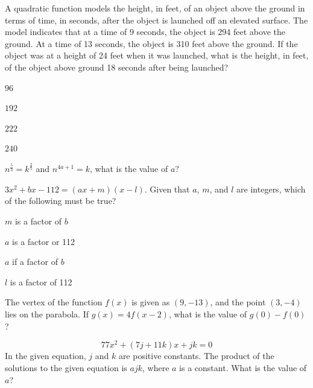 \vfill
\noindent\begin{minipage}{\linewidth}
\par\smallskip
A quadratic function models the height, in feet, of an object above the ground in terms of time, in seconds, after the object is launched off an elevated surface. The model indicates that at a time of 9 seconds, the object is 294 feet above the ground. At a time of 13 seconds, the object is 310 feet above the ground. If the object was at a height of 24 feet when it was launched, what is the height, in feet, of the object above ground 18 seconds after being launched?
\begin{satchoices}
  \item[A)] $96$
  \item[B)] $192$
  \item[C)] $222$
  \item[D)] $240$
\end{satchoices}
\end{minipage}
\vfill
\noindent\begin{minipage}{\linewidth}
\par\smallskip
$n^{\frac{5}{3}}=k^{\frac{2}{5}}$ and $n^{4a+1}=k$, what is the value of $a$?
\end{minipage}
\vfill
\clearpage
\noindent\begin{minipage}{\linewidth}
\par\smallskip
$3x^2+bx-112=(ax+m)(x-l)$. Given that $a$, $m$, and $l$ are integers, which of the following must be true?
\begin{satchoices}
  \item[A)] $m$ is a factor of $b$
  \item[B)] $a$ is a factor or 112
  \item[C)] $a$ if a factor of $b$
  \item[D)] $l$ is a factor of 112
\end{satchoices}
\end{minipage}
\vfill
\noindent\begin{minipage}{\linewidth}
\par\smallskip
The vertex of the function $f(x)$ is given as $(9,-13)$, and the point $(3,-4)$ lies on the parabola. If $g(x)=4f(x-2)$, what is the value of $g(0)-f(0)$?
\end{minipage}
\vfill
\noindent\begin{minipage}{\linewidth}
\par\smallskip
$$77x^2+(7j+11k)x+jk=0$$ In the given equation, $j$ and $k$ are positive constants. The product of the solutions to the given equation is $ajk$, where $a$ is a constant. What is the value of $a$?
\end{minipage}
